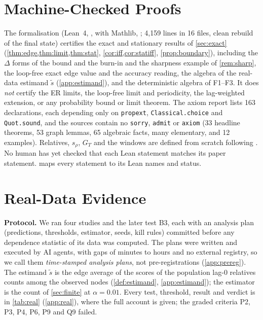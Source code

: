 \documentclass{article}
\theoremstyle{plain}
\theoremstyle{definition}
\theoremstyle{remark}
\newcommand{\GT}{G_T}
\newcommand{\srho}{s_\rho}
\begin{document}
\section{Machine-Checked Proofs}
\label{sec:lean}

The formalisation (Lean~4, \citealp{demoura2021lean4}, with Mathlib,
\citealp{mathlib2020}; 4{,}159 lines in 16 files, clean rebuild of the final
state) certifies the exact and stationary results of \cref{sec:exact}
(\cref{thm:edge,thm:limit,thm:stat}, \cref{cor:iff,cor:statiff},
\cref{prop:boundary}), including the $\Delta$ forms of the bound and the
burn-in and the sharpness example of \cref{rem:sharp}, the loop-free exact
edge value and the accuracy reading, the algebra of the real-data estimand
$\tilde s$ (\cref{app:estimand}), and the deterministic algebra of F1--F3. It
does \emph{not} certify the ER limits, the loop-free limit and periodicity,
the lag-weighted extension, or any probability bound or limit theorem. The
axiom report lists 163 declarations, each depending only on
\texttt{propext}, \texttt{Classical.choice} and \texttt{Quot.sound}, and the
sources contain no \texttt{sorry}, \texttt{admit} or \texttt{axiom} (33
headline theorems, 53 graph lemmas, 65 algebraic facts, many elementary, and
12 examples). Relatives, $\srho$, $\GT$ and the windows are defined from
scratch following \citet{reisach2026topological}. No human has yet checked that each Lean
statement matches its paper statement.  maps every statement to its Lean names and status.


\section{Real-Data Evidence}
\label{sec:real}

\textbf{Protocol.} We ran four studies and the later test B3, each with an
analysis plan (predictions, thresholds, estimator, seeds, kill rules)
committed before any dependence statistic of its data was computed. The plans
were written and executed by AI agents, with gaps of minutes to hours and no
external registry, so we call them \emph{time-stamped analysis plans}, not
pre-registrations (\cref{app:prereg}). The estimand $\tilde s$ is the edge
average of the scores of the population lag-0 relatives counts among the
observed nodes (\cref{def:estimand}, \cref{app:estimand}); the estimator is the
count of \cref{sec:finite} at $\alpha=0.01$. Every test, threshold, result and
verdict is in \cref{tab:real} (\cref{app:real}), where the full account is
given; the graded criteria P2, P3, P4, P6, P9 and Q9 failed.
\end{document}
